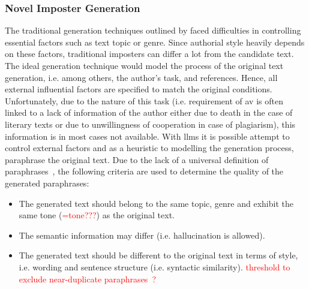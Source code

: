 \subsubsection{Novel Imposter Generation}
\label{subsubsec:novel_imposter_generation}
The traditional generation techniques outlined by \citet{koppel_determining_2014} faced difficulties in controlling essential factors such as text topic or genre.
Since authorial style heavily depends on these factors, traditional imposters can differ a lot from the candidate text.
The ideal generation technique would model the process of the original text generation, 
i.e. among others, the author's task, and references.
Hence, all external influential factors are specified to match the original conditions.
Unfortunately, due to the nature of this task 
(i.e. requirement of \ac{av} is often linked to a lack of information of the author either due to death in the case of literary texts or 
due to unwillingness of cooperation in case of plagiarism), this information is in most cases not available.
With \acp{llm} it is possible attempt to control external factors and 
as a heuristic to modelling the generation process, paraphrase the original text.
Due to the lack of a universal definition of paraphrases~\cite{gohsen_task_oriented_2024}, the following criteria are used to determine the quality of the generated paraphrases:
\begin{itemize}
    \item The generated text should belong to the same topic, genre and exhibit the same tone (\textcolor{red}{=tone???}) as the original text.
    \item The semantic information may differ (i.e. hallucination is allowed).
    \item The generated text should be different to the original text in terms of style, i.e. wording and sentence structure (i.e. syntactic similarity). \textcolor{red}{threshold to exclude near-duplicate paraphrases~\cite{gohsen_captions_2023}?}
\end{itemize}

